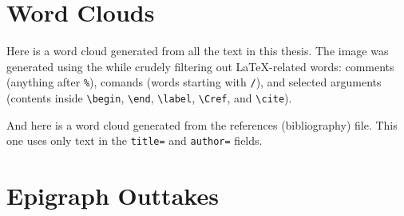 
\section{Word Clouds}

Here is a word cloud generated from all the text in this thesis.
The image was generated using the  while crudely filtering out LaTeX-related words: comments (anything after \verb|%|), comands (words starting with \verb|/|), and selected arguments (contents inside \verb|\begin|, \verb|\end|, \verb|\label|, \verb|\Cref|, and \verb|\cite|).


And here is a word cloud generated from the references (bibliography) file.
This one uses only text in the \verb|title=| and \verb|author=| fields.


\section{Epigraph Outtakes}

